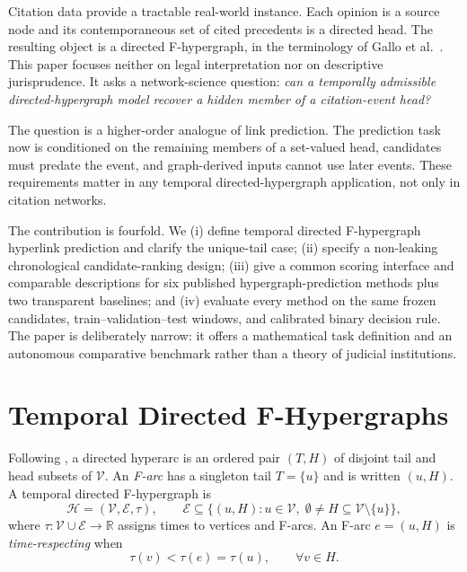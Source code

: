 \documentclass{svproc}
\newcommand{\Hcal}{\mathcal{H}}
\newcommand{\Ecal}{\mathcal{E}}
\newcommand{\Vcal}{\mathcal{V}}
\newcommand{\R}{\mathbb{R}}
\begin{document}
Citation data provide a tractable real-world instance. Each opinion is a source node and its contemporaneous set of cited precedents is a directed head. The resulting object is a directed F-hypergraph, in the terminology of Gallo et al.~\cite{gallo1993directed}. This paper focuses neither on legal interpretation nor on descriptive jurisprudence. It asks a network-science question: \emph{can a temporally admissible directed-hypergraph model recover a hidden member of a citation-event head?}

The question is a higher-order analogue of link prediction. The prediction task now is conditioned on the remaining members of a set-valued head, candidates must predate the event, and graph-derived inputs cannot use later events. These requirements matter in any temporal directed-hypergraph application, not only in citation networks.

The contribution is fourfold. We (i) define temporal directed F-hypergraph hyperlink prediction and clarify the unique-tail case; (ii) specify a non-leaking chronological candidate-ranking design; (iii) give a common scoring interface and comparable descriptions for six published hypergraph-prediction methods plus two transparent baselines; and (iv) evaluate every method on the same frozen candidates, train--validation--test windows, and calibrated binary decision rule. The paper is deliberately narrow: it offers a mathematical task definition and an autonomous comparative benchmark rather than a theory of judicial institutions.

\section{Temporal Directed F-Hypergraphs}
\label{sec:model}

\begin{definition}
Following \cite{gallo1993directed}, a directed hyperarc is an ordered pair $(T,H)$ of disjoint tail and head subsets of $\Vcal$. An \emph{F-arc} has a singleton tail $T=\{u\}$ and is written $(u,H)$. A temporal directed F-hypergraph is
\begin{equation}
\Hcal=(\Vcal,\Ecal,\tau),\qquad
\Ecal\subseteq\{(u,H):u\in\Vcal,\;\emptyset\neq H\subseteq\Vcal\setminus\{u\}\},
\label{eq:fhypergraph}
\end{equation}
where $\tau:\Vcal\cup\Ecal\to\R$ assigns times to vertices and F-arcs. An F-arc $e=(u,H)$ is \emph{time-respecting} when
\begin{equation}
\tau(v)<\tau(e)=\tau(u),\qquad \forall v\in H.
\label{eq:temporal}
\end{equation}
\end{definition}
\end{document}
